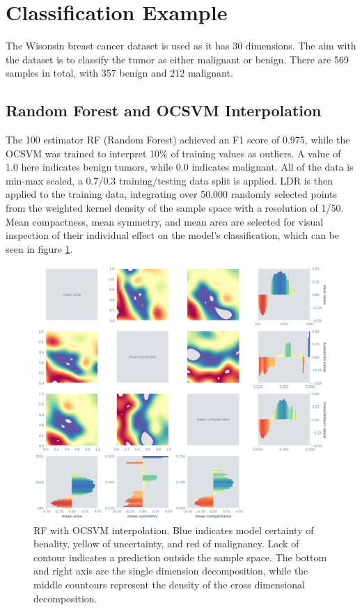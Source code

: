 \documentclass[a4paperpaper,twocolumn]{article}
\begin{document}
\section{Classification Example}

The Wisonsin breast cancer dataset is used as it has 30 dimensions. The aim with the dataset is to classify the tumor as either malignant or benign. There are 569 samples in total, with 357 benign and 212 malignant.

\subsection{Random Forest and OCSVM Interpolation}

The 100 estimator RF (Random Forest) achieved an F1 score of 0.975, while the OCSVM was trained to interpret 10\% of training values as outliers. A value of 1.0 here indicates benign tumors, while 0.0 indicates malignant. All of the data is min-max scaled, a 0.7/0.3 training/testing data split is applied. LDR is then applied to the training data, integrating over 50,000 randomly selected points from the weighted kernel density of the sample space with a resolution of 1/50. Mean compactness, mean symmetry, and mean area are selected for visual inspection of their individual effect on the model's classification, which can be seen in figure \ref{fig:rf-ocsvm-matrix}.

\begin{figure}
\centering
\includegraphics[width=\columnwidth]{img/rf_ocsvm_matrix.png}
\caption{RF with OCSVM interpolation. Blue indicates model certainty of benality, yellow of uncertainty, and red of malignancy. Lack of contour indicates a prediction outside the sample space. The bottom and right axis are the single dimension decomposition, while the middle countours represent the density of the cross dimensional decomposition.}
\label{fig:rf-ocsvm-matrix}
\end{figure}
\end{document}
